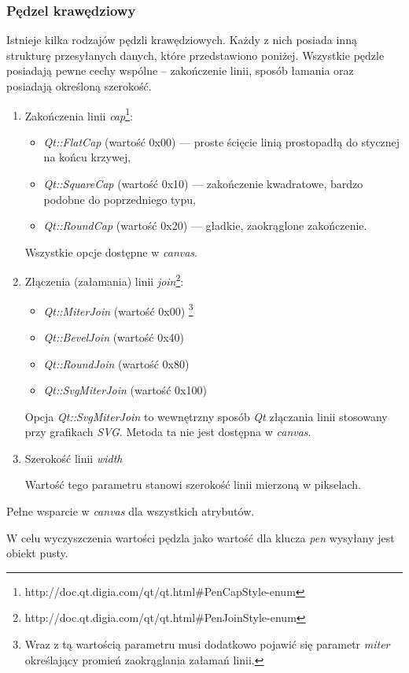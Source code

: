\subsubsection{Pędzel krawędziowy}
Istnieje kilka rodzajów pędzli krawędziowych. Każdy z nich posiada inną strukturę przesyłanych danych, które przedstawiono poniżej. Wszystkie pędzle posiadają pewne cechy wspólne -- zakończenie linii, sposób łamania oraz posiadają określoną szerokość.
\begin{enumerate}
\item Zakończenia linii \emph{cap}\footnote{http://doc.qt.digia.com/qt/qt.html\#PenCapStyle-enum}:
\begin{itemize}
\item \emph{Qt::FlatCap} (wartość 0x00) --- proste ścięcie linią prostopadłą do stycznej na końcu krzywej,
\item \emph{Qt::SquareCap} (wartość 0x10) --- zakończenie kwadratowe, bardzo podobne do poprzedniego typu,
\item \emph{Qt::RoundCap} (wartość 0x20) --- gładkie, zaokrąglone zakończenie.
\end{itemize}
Wszystkie opcje dostępne w \emph{canvas}.

\item Złączenia (załamania) linii \emph{join}\footnote{http://doc.qt.digia.com/qt/qt.html\#PenJoinStyle-enum}:
\begin{itemize}
\item \emph{Qt::MiterJoin} (wartość 0x00) \footnote{Wraz z tą wartością parametru musi dodatkowo pojawić się parametr \emph{miter} określający promień zaokrąglania załamań linii.}
\item \emph{Qt::BevelJoin} (wartość 0x40)
\item \emph{Qt::RoundJoin} (wartość 0x80)
\item \emph{Qt::SvgMiterJoin} (wartość 0x100)
\end{itemize}
Opcja \emph{Qt::SvgMiterJoin} to wewnętrzny sposób \emph{Qt} złączania linii stosowany przy grafikach \emph{SVG}. Metoda ta nie jest dostępna w \emph{canvas}.

\item Szerokość linii \emph{width}

Wartość tego parametru stanowi szerokość linii mierzoną w pikselach.
\end{enumerate}
Pełne wsparcie w \emph{canvas} dla wszystkich atrybutów.

W celu wyczyszczenia wartości pędzla jako wartość dla klucza \emph{pen} wysyłany jest obiekt pusty.

